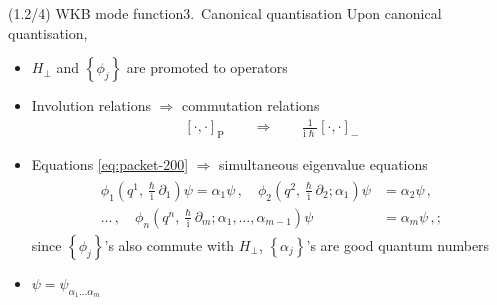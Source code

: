 \documentclass[mathserif]{beamer}
\newcommand{\sbr}[1]{{\left[#1\right]}}
\newcommand{\cbr}[1]{{\left\{#1\right\}}}
\newcommand{\rfun}[2]{#1\mathopen{}\left(#2\right)\mathclose{}}
\newcommand\mi{\mathrm{i}} %
\begin{document}
\begin{frame}{(1.2/4) WKB mode function}{3.\ Canonical quantisation}
Upon canonical quantisation,
\begin{itemize}
    \item $H_\perp$ and $\cbr{\phi_j}$ are promoted to operators
    \item Involution relations $\Rightarrow$ commutation relations
    \begin{align}
        \sbr{\cdot,\cdot}_{\text{P}}
        \qquad\Rightarrow\qquad
        \tfrac{1}{\mi \hslash}\sbr{\cdot,\cdot}_{-}
    \end{align}
    \item
    Equations \eqref{eq:packet-200} $\Rightarrow$ simultaneous eigenvalue equations
    \begin{align}
\begin{split}
    \rfun{\phi_1}{q^1, \tfrac{\hslash}{\mi}\partial_1} \psi = \alpha_1 \psi\,,
    \quad
    \rfun{\phi_2}{q^2, \tfrac{\hslash}{\mi}\partial_2; \alpha_1} \psi &= \alpha_2 \psi\,, \\
    \ldots\,,\quad
    \rfun{\phi_n}{q^n, \tfrac{\hslash}{\mi}\partial_m; \alpha_1,\ldots, \alpha_{m-1}}\psi &= \alpha_m \psi\,,;
\end{split}
    \label{eq:packet-300}
    \end{align}
    since $\cbr{\phi_j}$'s also commute with $H_\perp$, $\cbr{\alpha_j}$'s are good quantum numbers
    
    \item
    $\psi = \psi_{\alpha_1 \ldots \alpha_m}$
\end{itemize}
\end{frame}
\end{document}
